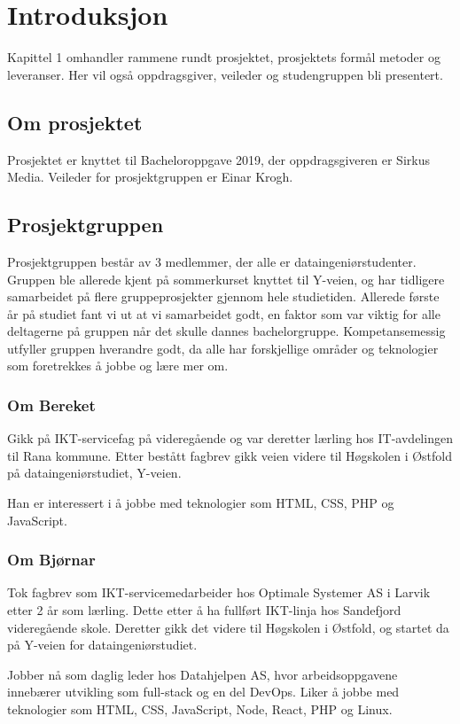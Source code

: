 \cleardoublepage
\chapter{Introduksjon}
\label{chap:intro}
Kapittel 1 omhandler rammene rundt prosjektet, prosjektets formål metoder og leveranser. Her vil også oppdragsgiver, veileder og studengruppen bli presentert. 

\section{Om prosjektet}
Prosjektet er knyttet til Bacheloroppgave 2019, der oppdragsgiveren er Sirkus Media. Veileder for prosjektgruppen er Einar Krogh. 

\section{Prosjektgruppen}

Prosjektgruppen består av 3 medlemmer, der alle er dataingeniørstudenter. Gruppen ble allerede kjent på sommerkurset knyttet til Y-veien, og har tidligere samarbeidet på flere gruppeprosjekter gjennom hele studietiden. Allerede første år på studiet fant vi ut at vi samarbeidet godt, en faktor som var viktig for alle deltagerne på gruppen når det skulle dannes bachelorgruppe. Kompetansemessig utfyller gruppen hverandre godt, da alle har forskjellige områder og teknologier som foretrekkes å jobbe og lære mer om.  

\subsection{Om Bereket}
Gikk på IKT-servicefag på  videregående og var deretter lærling hos IT-avdelingen til Rana kommune. Etter bestått fagbrev gikk veien videre til Høgskolen i Østfold på dataingeniørstudiet, Y-veien.

Han er interessert i å jobbe med teknologier som HTML, CSS, PHP og JavaScript.

\subsection{Om Bjørnar}
Tok fagbrev som IKT-servicemedarbeider hos Optimale Systemer AS i Larvik etter 2 år som lærling. Dette etter å ha fullført IKT-linja hos Sandefjord videregående skole. Deretter gikk det videre til Høgskolen i Østfold, og startet da på Y-veien for dataingeniørstudiet.

Jobber nå som daglig leder hos Datahjelpen AS, hvor arbeidsoppgavene innebærer utvikling som full-stack og en del DevOps. Liker å jobbe med teknologier som HTML, CSS, JavaScript, Node, React, PHP og Linux.

